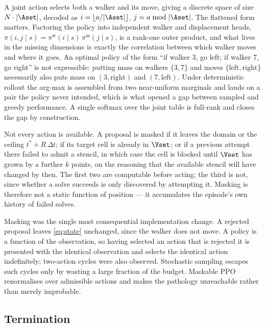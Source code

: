 A joint action selects both a walker and its move, giving a discrete space of
size $N \cdot |\Aset|$, decoded as $i = \lfloor a / |\Aset| \rfloor$,
$j = a \bmod |\Aset|$. The flattened form matters. Factoring the policy into
independent walker and displacement heads,
$\pi(i,j \mid s) = \pi^{\mathrm{w}}(i \mid s)\,\pi^{\mathrm{m}}(j \mid s)$,
is a rank-one outer product, and what lives in the missing dimensions is
exactly the correlation between which walker moves and where it goes. An
optimal policy of the form ``if walker 3, go left; if walker 7, go right''
is not expressible: putting mass on walkers $\{3,7\}$ and moves
$\{\text{left},\text{right}\}$ necessarily also puts mass on
$(3, \text{right})$ and $(7, \text{left})$. Under deterministic rollout the
arg-max is assembled from two near-uniform marginals and lands on a pair the
policy never intended, which is what opened a gap between sampled and greedy
performance. A single softmax over the joint table is full-rank and closes
the gap by construction.

Not every action is available. A proposal is masked if it leaves the domain
or the ceiling $t^* + R\,\Delta t$; if its target cell is already in $\Vset$;
or if a previous attempt there failed to admit a stencil, in which case the
cell is blocked until $\Vset$ has grown by a further $k$ points, on the
reasoning that the available stencil will have changed by then. The first
two are computable before acting; the third is not, since whether a solve
succeeds is only discovered by attempting it. Masking is therefore not a
static function of position --- it accumulates the episode's own history of
failed solves.

Masking was the single most consequential implementation change. A rejected
proposal leaves \cref{eq:state} unchanged, since the walker does not move. A
policy is a function of the observation, so having selected an action that is
rejected it is presented with the identical observation and selects the
identical action indefinitely; two-action cycles were also observed.
Stochastic sampling escapes such cycles only by wasting a large fraction of
the budget. Maskable PPO  renormalises over admissible
actions and makes the pathology unreachable rather than merely improbable.

\subsection{Termination}
\label{sec:mdp_term}

